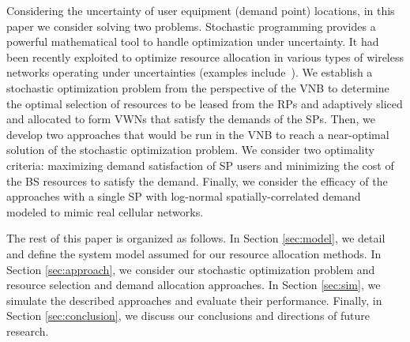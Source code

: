 \documentclass[onecolumn,draftcls]{IEEEtran}
\begin{document}
Considering the uncertainty of user equipment (demand point) locations, in this paper we consider solving two problems.  Stochastic programming provides a powerful mathematical tool to handle optimization under uncertainty.  It had been recently exploited to optimize resource allocation in various types of wireless networks operating under uncertainties (examples include~\cite{MJ_TW_13, CC_OFDMA, MJ_MECOMM_17, MJ_CCNC_16, MJ_WCNC_16, MJ_DySPAN_15, CC_video}).  We establish a stochastic optimization problem from the perspective of the VNB to determine the optimal selection of resources to be leased from the RPs and adaptively sliced and allocated to form VWNs that satisfy the demands of the SPs.  Then, we develop two approaches that would be run in the VNB to reach a near-optimal solution of the stochastic optimization problem.  We consider two optimality criteria: maximizing demand satisfaction of SP users and minimizing the cost of the BS resources to satisfy the demand.  Finally, we consider the efficacy of the approaches with a single SP with log-normal spatially-correlated demand modeled to mimic real cellular networks.

The rest of this paper is organized as follows.  In Section \ref{sec:model}, we detail and define the system model assumed for our resource allocation methods.  In Section \ref{sec:approach}, we consider our stochastic optimization problem and resource selection and demand allocation approaches.  In Section \ref{sec:sim}, we simulate the described approaches and evaluate their performance.  Finally, in Section \ref{sec:conclusion}, we discuss our conclusions and directions of future research.

%
%
\end{document}
